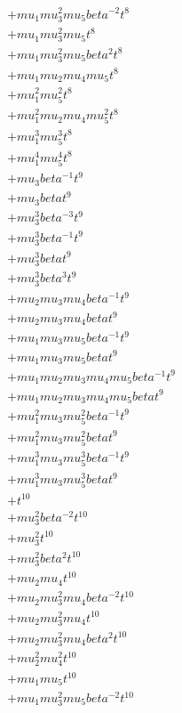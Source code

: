 \begin{align*}
  + mu_1 mu_3^{2} mu_5 beta^{-2} t^{8} \\
  + mu_1 mu_3^{2} mu_5 t^{8} \\
  + mu_1 mu_3^{2} mu_5 beta^{2} t^{8} \\
  + mu_1 mu_2 mu_4 mu_5 t^{8} \\
  + mu_1^{2} mu_5^{2} t^{8} \\
  + mu_1^{2} mu_2 mu_4 mu_5^{2} t^{8} \\
  + mu_1^{3} mu_5^{3} t^{8} \\
  + mu_1^{4} mu_5^{4} t^{8} \\
  + mu_3 beta^{-1} t^{9} \\
  + mu_3 beta t^{9} \\
  + mu_3^{3} beta^{-3} t^{9} \\
  + mu_3^{3} beta^{-1} t^{9} \\
  + mu_3^{3} beta t^{9} \\
  + mu_3^{3} beta^{3} t^{9} \\
  + mu_2 mu_3 mu_4 beta^{-1} t^{9} \\
  + mu_2 mu_3 mu_4 beta t^{9} \\
  + mu_1 mu_3 mu_5 beta^{-1} t^{9} \\
  + mu_1 mu_3 mu_5 beta t^{9} \\
  + mu_1 mu_2 mu_3 mu_4 mu_5 beta^{-1} t^{9} \\
  + mu_1 mu_2 mu_3 mu_4 mu_5 beta t^{9} \\
  + mu_1^{2} mu_3 mu_5^{2} beta^{-1} t^{9} \\
  + mu_1^{2} mu_3 mu_5^{2} beta t^{9} \\
  + mu_1^{3} mu_3 mu_5^{3} beta^{-1} t^{9} \\
  + mu_1^{3} mu_3 mu_5^{3} beta t^{9} \\
  + t^{10} \\
  + mu_3^{2} beta^{-2} t^{10} \\
  + mu_3^{2} t^{10} \\
  + mu_3^{2} beta^{2} t^{10} \\
  + mu_2 mu_4 t^{10} \\
  + mu_2 mu_3^{2} mu_4 beta^{-2} t^{10} \\
  + mu_2 mu_3^{2} mu_4 t^{10} \\
  + mu_2 mu_3^{2} mu_4 beta^{2} t^{10} \\
  + mu_2^{2} mu_4^{2} t^{10} \\
  + mu_1 mu_5 t^{10} \\
  + mu_1 mu_3^{2} mu_5 beta^{-2} t^{10} \\

\end{align*}
